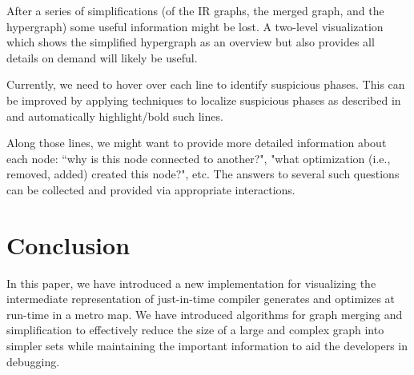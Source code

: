 \documentclass[runningheads]{llncs}
\begin{document}
After a series of simplifications (of the IR graphs, the merged graph, and the hypergraph) some useful information might be lost. A two-level visualization which shows the simplified hypergraph as an overview but also provides all details on demand will likely be useful.

Currently, we need to hover over each line to identify suspicious phases. This can be improved by applying techniques to localize suspicious phases as described in~\cite{DBLP:conf/vee/LimD21} and automatically highlight/bold such lines.

Along those lines, we might want to provide more detailed information about each node: ``why is this node connected to another?", "what optimization (i.e., removed, added) created this node?", etc. The answers to several such  questions can be collected and provided via appropriate interactions.

\section{Conclusion}\label{sec:conclusion}
In this paper, we have introduced a new implementation for visualizing the intermediate representation of just-in-time compiler generates and optimizes at run-time in a metro map. We have introduced algorithms for graph merging and simplification to effectively reduce the size of a large and complex graph into simpler sets while maintaining the important information to aid the developers in debugging.

\raggedright
%
%

\clearpage
\end{document}
